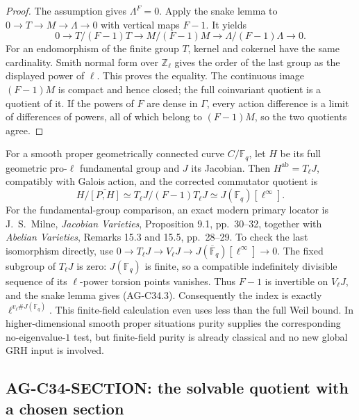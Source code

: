 \begin{proof}
The assumption gives $\Lambda^F=0$. Apply the snake lemma to
$0\to T\to M\to\Lambda\to0$ with vertical maps $F-1$.
It yields
\[
 0\longrightarrow T/(F-1)T\longrightarrow M/(F-1)M
 \longrightarrow\Lambda/(F-1)\Lambda\longrightarrow0.
\]
For an endomorphism of the finite group $T$, kernel and cokernel have
the same cardinality. Smith normal form over $\mathbb Z_\ell$ gives
the order of the last group as the displayed power of $\ell$.
This proves the equality. The continuous image $(F-1)M$ is compact
and hence closed; the full coinvariant quotient is a quotient of it.
If the powers of $F$ are dense in $\Gamma$, every action difference
is a limit of differences of powers, all of which belong to
$(F-1)M$, so the two quotients agree.
\end{proof}

For a smooth proper geometrically connected curve $C/\mathbb F_q$,
let $H$ be its full geometric pro-$\ell$ fundamental group and $J$ its
Jacobian. Then $H^{\mathrm{ab}}=T_\ell J$, compatibly with Galois
action, and the corrected commutator quotient is
\[
 H/\overline{[P,H]}
       \simeq T_\ell J/(F-1)T_\ell J
       \simeq J(\mathbb F_q)[\ell^\infty].             \tag{AG-C34.3}
\]
For the fundamental-group comparison, an exact modern primary locator
is J.~S.~Milne, \emph{Jacobian Varieties}, Proposition 9.1,
pp.~30--32, together with \emph{Abelian Varieties}, Remarks 15.3
and 15.5, pp.~28--29. To check the last isomorphism directly, use
$0\to T_\ell J\to V_\ell J\to J(\overline{\mathbb F}_q)
[\ell^\infty]\to0$. The fixed subgroup of $T_\ell J$ is zero:
$J(\mathbb F_q)$ is finite, so a compatible indefinitely divisible
sequence of its $\ell$-power torsion points vanishes. Thus $F-1$ is
invertible on $V_\ell J$, and the snake lemma gives (AG-C34.3).
Consequently the index is exactly $\ell^{v_\ell\#J(\mathbb F_q)}$.
This finite-field calculation even uses less than the full Weil bound.
In higher-dimensional smooth proper situations purity supplies the
corresponding no-eigenvalue-$1$ test, but finite-field purity is already
classical and no new global GRH input is involved.

\subsection{AG-C34-SECTION: the solvable quotient with a chosen section}
\label{ag:c34section}


